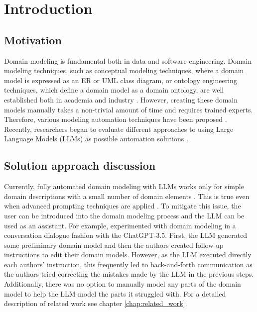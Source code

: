 \chapter*{Introduction}


\section*{Motivation}

Domain modeling is fundamental both in data and software engineering. Domain modeling techniques, such as conceptual modeling techniques, where a domain model is expressed as an ER or UML class diagram, or ontology engineering techniques, which define a domain model as a domain ontology, are well established both in academia and industry \cite{Verdonck2018}. However, creating these domain models manually takes a non-trivial amount of time and requires trained experts. Therefore, various modeling automation techniques have been proposed \cite{Sonbol2022}. Recently, researchers began to evaluate different approaches to using Large Language Models (LLMs) as possible automation solutions \cite{Chen2023,Saeedizade2024}.


\section*{Solution approach discussion}

Currently, fully automated domain modeling with LLMs works only for simple domain descriptions with a small number of domain elements \cite{Camara2023}. This is true even when advanced prompting techniques are applied \cite{Chen2023,Saeedizade2024}. To mitigate this issue, the user can be introduced into the domain modeling process \cite{Camara2023} and the LLM can be used as an assistant. For example, \citet{Camara2023} experimented with domain modeling in a conversation dialogue fashion with the ChatGPT-3.5. First, the LLM generated some preliminary domain model and then the authors created follow-up instructions to edit their domain models. However, as the LLM executed directly each authors' instruction, this frequently led to back-and-forth communication as the authors tried correcting the mistakes made by the LLM in the previous steps. Additionally, there was no option to manually model any parts of the domain model to help the LLM model the parts it struggled with. For a detailed description of related work see chapter \ref{chap:related_work}.


